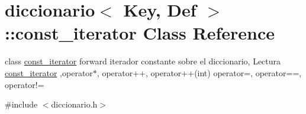 \hypertarget{classdiccionario_1_1const__iterator}{\section{diccionario$<$ Key, Def $>$\-:\-:const\-\_\-iterator Class Reference}
\label{classdiccionario_1_1const__iterator}
}


class \hyperlink{classdiccionario_1_1const__iterator}{const\-\_\-iterator} forward iterador constante sobre el diccionario, Lectura \hyperlink{classdiccionario_1_1const__iterator}{const\-\_\-iterator} ,operator$\ast$, operator++, operator++(int) operator=, operator==, operator!=  




{\ttfamily \#include $<$diccionario.\-h$>$}

